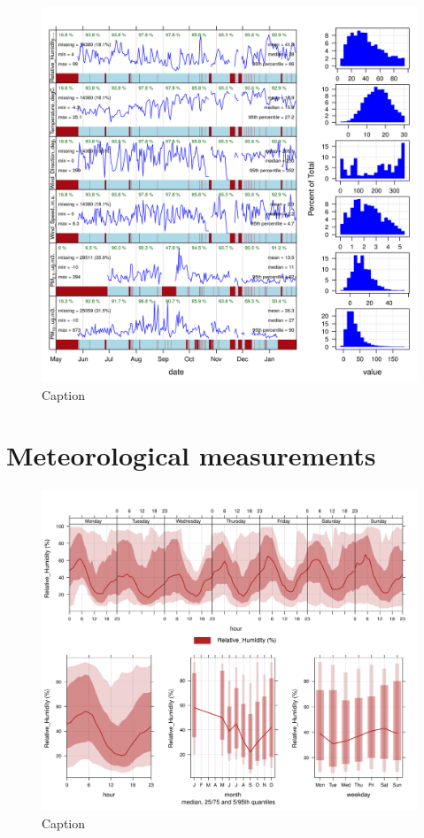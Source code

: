 \documentclass{nwureport}
\begin{document}
\begin{figure}[!htb]
    \centering
    \includegraphics[width=\textwidth]{images/Wedela-ams.png}
    \caption{Caption}
    \label{fig:summary}
\end{figure}

\section{Meteorological measurements}

\begin{figure}[!htb]
    \centering
    \includegraphics[width=\textwidth]{images/Wedela_Relative_Humidity_timevary.png}
    \caption{Caption}
    \label{fig:summary}
\end{figure}
\end{document}
